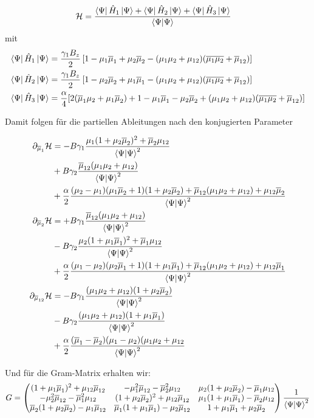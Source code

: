 \documentclass[12pt]{article}
\def\N{\bra{\Psi}\ket{\Psi}}
\def\muk{\overline{\mu}}
\begin{document}
\begin{align}
    \mathcal{H} &= \frac{\bra{\Psi}\hat{H}_1\ket{\Psi} +\bra{\Psi}\hat{H}_2\ket{\Psi} + \bra{\Psi}\hat{H}_3\ket{\Psi}}{\N}
\end{align}
mit 
\begin{align*}
    \bra{\Psi}\hat{H}_1\ket{\Psi} &=  \frac{\gamma_1 B_z}{2}\left[ 1- \mu_1\muk_1 + \mu_2\muk_2 - (\mu_1 \mu_2 + \mu_{12})(\overline{\mu_1\mu_2} + \muk_{12})\right] \\
    \bra{\Psi}\hat{H}_2\ket{\Psi} &=  \frac{\gamma_1 B_z}{2}\left[ 1- \mu_2\muk_2 + \mu_1\muk_1 - (\mu_1 \mu_2 + \mu_{12})(\overline{\mu_1\mu_2} + \muk_{12})\right] \\
    \bra{\Psi}\hat{H}_3\ket{\Psi} &= \frac{\alpha}{4}[2(\muk_1\mu_2 + \mu_1\muk_2) + 1 - \mu_1\muk_1 - \mu_2\muk_2 + (\mu_1 \mu_2 + \mu_{12})(\overline{\mu_1\mu_2} + \muk_{12})]
\end{align*}

\noindent Damit folgen für die partiellen Ableitungen nach den konjugierten Parameter

\begin{align*}
    \partial_{\muk_1} \mathcal{H} &= 
    -B\gamma_1 \frac{\mu_1(1+\mu_2\muk_2)^2 + \muk_2\mu_{12}}{\N^2}\\
    &+B\gamma_2 \frac{\muk_{12}(\mu_1\mu_2 + \mu_{12})}{\N^2}\\
    &+\frac{\alpha}{2}\frac{(\mu_2-\mu_1)(\mu_1\muk_2+1)(1+\mu_2\muk_2)+\muk_{12}(\mu_1\mu_2 + \mu_{12}) + \mu_{12}\muk_2}{\N^2}\\
    \partial_{\muk_2} \mathcal{H} &= 
    +B\gamma_1 \frac{\muk_{12}(\mu_1\mu_2 + \mu_{12})}{\N^2}\\
    &-B\gamma_2 \frac{\mu_2(1+\mu_1\muk_1)^2 + \muk_1\mu_{12}}{\N^2}\\
    &+\frac{\alpha}{2}\frac{(\mu_1-\mu_2)(\mu_2\muk_1+1)(1+\mu_1\muk_1)+\muk_{12}(\mu_1\mu_2 + \mu_{12}) + \mu_{12}\muk_1}{\N^2}\\
    \partial_{\muk_{12}} \mathcal{H} &= 
    -B\gamma_1\frac{(\mu_1\mu_2+\mu_{12})(1+\mu_2\muk_2)}{\N^2}\\
    &-B\gamma_2\frac{(\mu_1\mu_2+\mu_{12})(1+\mu_1\muk_1)}{\N^2}\\
    &+\frac{\alpha}{2}\frac{(\muk_1-\muk_2)(\mu_1-\mu_2)(\mu_1\mu_2+\mu_{12}}{\N^2}
\end{align*}

\noindent Und für die Gram-Matrix erhalten wir:
\begin{align}
    G &=
    \begin{pmatrix}
        (1+\mu_1\muk_1)^2 + \mu_{12}\muk_{12} & -\mu_1^2\muk_{12} - \muk_2^2\mu_{12} &  \mu_2(1+\mu_2\muk_2)-\muk_1\mu_{12}\\
        -\mu_2^2\muk_{12} - \muk_1^2\mu_{12} &(1+\mu_2\muk_2)^2 + \mu_{12}\muk_{12} & \mu_1(1+\mu_1\muk_1)-\muk_2\mu_{12}\\
        \muk_2(1+\mu_2\muk_2)-\mu_1\muk_{12} & \muk_1(1+\mu_1\muk_1)-\mu_2\muk_{12} & 1 + \mu_1\muk_1 + \mu_2\muk_2
    \end{pmatrix}\frac{1}{\N^2} \\
\end{align}
\end{document}
